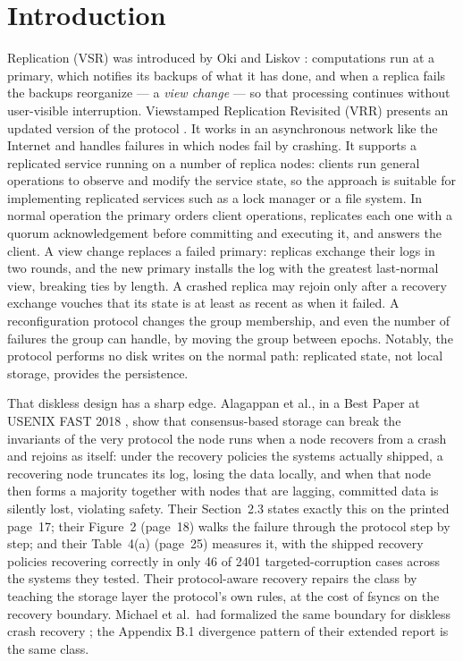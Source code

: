 \documentclass[10pt,journal,letterpaper]{IEEEtran}
\begin{document}
\section{Introduction}
 Replication (VSR) was introduced by Oki and
Liskov \cite{vsr}: computations run at a primary, which notifies its backups of what
it has done, and when a replica fails the backups reorganize --- a
\emph{view change} --- so that processing continues without user-visible
interruption. Viewstamped Replication Revisited (VRR) presents an updated
version of the protocol \cite{vrr}. It works in an asynchronous network like
the Internet and handles failures in which nodes fail by crashing. It supports
a replicated service running on a number of replica nodes: clients run
general operations to observe and modify the service state, so the approach is
suitable for implementing replicated services such as a lock manager or a
file system. In normal operation the primary orders client operations,
replicates each one with a quorum acknowledgement before committing and
executing it, and answers the client. A view change replaces a failed primary:
replicas exchange their logs in two rounds, and the new primary installs the
log with the greatest last-normal view, breaking ties by length. A crashed
replica may rejoin only after a recovery exchange vouches that its state is
at least as recent as when it failed. A reconfiguration protocol changes the
group membership, and even the number of failures the group can handle, by
moving the group between epochs. Notably, the protocol performs no disk writes
on the normal path: replicated state, not local storage, provides the
persistence.

That diskless design has a sharp edge. Alagappan et al., in a Best Paper at
USENIX FAST 2018 \cite{alagappan2018}, show that consensus-based storage can
break the invariants of the very protocol the node runs when a node recovers
from a crash and rejoins as itself: under the recovery policies the systems
actually shipped, a recovering node truncates its log, losing the data
locally, and when that node then forms a majority together with nodes that
are lagging, committed data is silently lost, violating safety. Their
Section~2.3 states exactly this on the printed page~17; their Figure~2
(page~18) walks the failure through the protocol step by step; and their
Table~4(a) (page~25) measures it, with the shipped recovery policies
recovering correctly in only 46 of 2401 targeted-corruption cases across the
systems they tested. Their protocol-aware recovery repairs the class by
teaching the storage layer the protocol's own rules, at the cost of fsyncs on
the recovery boundary. Michael
et al.\ had formalized the same boundary for diskless crash recovery
\cite{diskless,recovery}; the Appendix B.1 divergence pattern of their
extended report is the same class.
\end{document}
